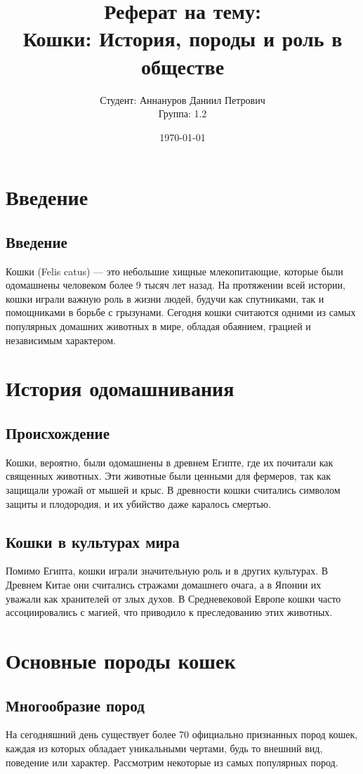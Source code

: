 \documentclass{report}
\title{Реферат на тему: \\[0.5cm] \textbf{Кошки: История, породы и роль в обществе}}
\author{Студент: Аннануров Даниил Петрович \\ Группа: 1.2}
\date{\today}                %
\begin{document}
 
 
\maketitle                  %
\chapter{Введение}

\section{Введение} 
Кошки (Felis catus) — это небольшие хищные млекопитающие, которые были одомашнены человеком более 9 тысяч лет назад. На протяжении всей истории, кошки играли важную роль в жизни людей, будучи как спутниками, так и помощниками в борьбе с грызунами. Сегодня кошки считаются одними из самых популярных домашних животных в мире, обладая обаянием, грацией и независимым характером.

\chapter{История одомашнивания}

\section{Происхождение}
Кошки, вероятно, были одомашнены в древнем Египте, где их почитали как священных животных. Эти животные были ценными для фермеров, так как защищали урожай от мышей и крыс. В древности кошки считались символом защиты и плодородия, и их убийство даже каралось смертью.

\section{Кошки в культурах мира}
Помимо Египта, кошки играли значительную роль и в других культурах. В Древнем Китае они считались стражами домашнего очага, а в Японии их уважали как хранителей от злых духов. В Средневековой Европе кошки часто ассоциировались с магией, что приводило к преследованию этих животных.

\chapter{Основные породы кошек}

\section{Многообразие пород}
На сегодняшний день существует более 70 официально признанных пород кошек, каждая из которых обладает уникальными чертами, будь то внешний вид, поведение или характер. Рассмотрим некоторые из самых популярных пород.
\end{document}

